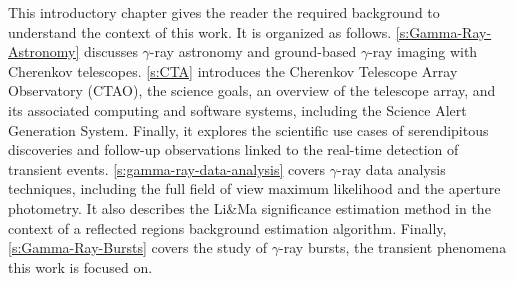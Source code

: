 \begin{chapabstract}
\small{
This introductory chapter gives the reader the required background to understand the context of this work. It is organized as follows.
\autoref{s:Gamma-Ray-Astronomy} discusses $\gamma$-ray astronomy and ground-based $\gamma$-ray imaging with Cherenkov telescopes. \autoref{s:CTA} introduces the Cherenkov Telescope Array Observatory (CTAO), the science goals, an overview of the telescope array, and its associated computing and software systems, including the Science Alert Generation System. Finally, it explores the scientific use cases of serendipitous discoveries and follow-up observations linked to the real-time detection of transient events. \autoref{s:gamma-ray-data-analysis} covers $\gamma$-ray data analysis techniques, including the full field of view maximum likelihood and the aperture photometry. It also describes the Li\&Ma significance estimation method in the context of a reflected regions background estimation algorithm. Finally, \autoref{s:Gamma-Ray-Bursts} covers the study of $\gamma$-ray bursts, the transient phenomena this work is focused on.
}\\
\begin{center}
\noindent\makebox[0.8\linewidth]{\rule{0.66\paperwidth}{0.4pt}}
\end{center}
\vspace{1cm}
\end{chapabstract}

